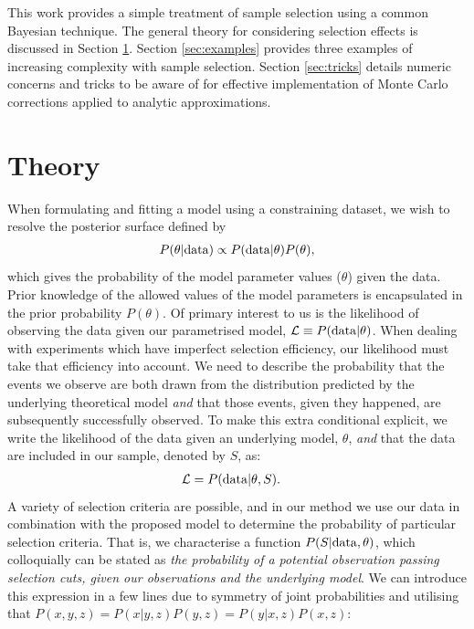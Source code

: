 \documentclass[a4paper,fleqn,usenatbib]{mnras}
\begin{document}
This work provides a simple treatment of sample selection using a common Bayesian technique. The general theory for considering selection effects is discussed in Section \ref{sec:theory}. Section \ref{sec:examples} provides three examples of increasing complexity with sample selection. Section \ref{sec:tricks} details numeric concerns and tricks to be aware of for effective implementation of Monte Carlo corrections applied to analytic approximations.






\section{Theory}
\label{sec:theory}

When formulating and fitting a model using a constraining dataset, we wish to resolve the posterior surface defined by
\begin{align}
P(\theta | {\rm data}) \propto P({\rm data} | \theta) P(\theta),
\end{align}
which gives the probability of the model parameter values ($\theta$) given the data.  Prior knowledge of the allowed values of the model parameters is encapsulated in the prior probability $P(\theta)$. Of primary interest to us is the likelihood of observing the data given our parametrised model, $\mathcal{L} \equiv P({\rm data} | \theta)$. When dealing with experiments which have imperfect selection efficiency, our likelihood must take that efficiency into account.  We need to describe the probability that the events we observe are both drawn from the distribution predicted by the underlying theoretical model \textit{and} that those events, given they happened, are subsequently successfully observed.  To make this extra conditional explicit, we write the likelihood of the data given an underlying model, $\theta$, \textit{and} that the data are included in our sample, denoted by $S$, as:
\begin{align}
\mathcal{L} &= P({\rm data} | \theta, S). \label{eq:like}
\end{align}
A variety of selection criteria are possible, and in our method we use our data in combination with the proposed model to determine the probability of particular selection criteria.  That is, we characterise a function $P(S|{\rm data},\theta)$, which colloquially can be stated as \textit{the probability of a potential observation passing selection cuts, given our observations and the underlying model}. We can introduce this expression in a few lines due to symmetry of joint probabilities and utilising that $P(x,y,z) = P(x|y,z)P(y,z) = P(y|x, z)P(x, z)$:
\end{document}
